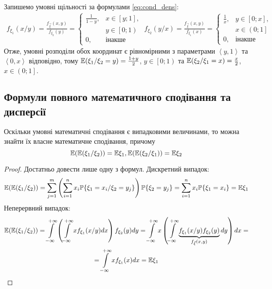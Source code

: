 \begin{example}
\begin{gather*}
    \end{gather*}
    Запишемо умовні щільності за формулами \eqref{eq:cond_dens}: 
    \begin{gather*}
        f_{\xi_1}(x/y) = \frac{f_{\vec{\xi}}(x, y)}{f_{\xi_2}(y)} = \begin{cases}
            \frac{1}{1-y}, & x \in \left[ y; 1\right], \\
            & y \in \left[ 0; 1\right)\\
            0, & \text{інакше}
        \end{cases}\;
        f_{\xi_2}(y/x) = \frac{f_{\vec{\xi}}(x, y)}{f_{\xi_1}(x)} = \begin{cases}
            \frac{1}{x}, & y \in \left[ 0; x\right], \\
            & x \in \left( 0; 1\right] \\
            0, & \text{інакше}
        \end{cases}
    \end{gather*}
    Отже, умовні розподіли обох координат є рівномірними з параметрами $\left< y, 1\right>$ та $\left<0, x\right>$ відповідно,
    тому 
    $\mathbb{E}(\xi_1 / \xi_2 = y) = \frac{1+y}{2}$, $y \in \left[ 0; 1\right)$ та
    $\mathbb{E}(\xi_2 / \xi_1 = x) = \frac{x}{2}$, $x \in \left( 0; 1\right]$.
\end{example}
\subsection{Формули повного математичного сподівання та дисперсії}
\begin{proposition*}
    Оскільки умовні математичні сподівання є випадковими величинами, то можна знайти їх власне математичне сподівання,
    причому 
    \begin{equation}
        \mathbb{E}(\mathbb{E}(\xi_1 / \xi_2)) = \mathbb{E}\xi_1, \mathbb{E}(\mathbb{E}(\xi_2 / \xi_1)) = \mathbb{E}\xi_2
    \end{equation}
\end{proposition*}
\begin{proof} Достатньо довести лише одну з формул.
    Дискретний випадок:
    $$\mathbb{E}(\mathbb{E}(\xi_1 / \xi_2)) = \sum\limits_{j = 1}^m 
    \left(
        \sum\limits_{i=1}^n x_i \mathbb{P}\{\xi_1 = x_i / \xi_2 = y_j\}
    \right) \mathbb{P}\{\xi_2 = y_j\} = 
    \sum\limits_{i=1}^n x_i \mathbb{P}\{\xi_1 = x_i\} = \mathbb{E}\xi_1$$
    Неперервний випадок:
    \begin{gather*}
        \mathbb{E}(\mathbb{E}(\xi_1 / \xi_2)) = \int\limits_{-\infty}^{+\infty} 
        \left(
            \int\limits_{-\infty}^{+\infty} x f_{\xi_1}(x / y) dx
        \right) f_{\xi_2}(y) dy = 
        \int\limits_{-\infty}^{+\infty} x \left(\int\limits_{-\infty}^{+\infty} 
        \underbrace{f_{\xi_1}(x / y) f_{\xi_2}(y)}_{f_{\vec{\xi}}(x, y)}
        dy\right) dx = \\
        = \int\limits_{-\infty}^{+\infty} x f_{\xi_1}(x) dx = \mathbb{E}\xi_1
    \end{gather*}
\end{proof}

